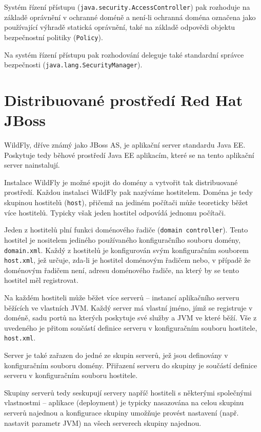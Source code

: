 Systém řízení přístupu ({\tt java.security.AccessController}) pak rozhoduje na základě oprávnění v ochranné doméně a není-li ochranná doména označena jako používající výhradě statická oprávnění, také na základě odpovědi objektu bezpečnostní politiky ({\tt Policy}).

Na systém řízení přístupu pak rozhodování deleguje také standardní správce bezpečnosti ({\tt java.lang.SecurityManager}).


\chapter{Distribuované prostředí Red Hat JBoss}

WildFly, dříve známý jako JBoss AS, je aplikační server standardu Java EE. Poskytuje tedy běhové prostředí Java EE aplikacím, které se na tento aplikační server nainstalují.

Instalace WildFly je možné spojit do domény a vytvořit tak distribuované prostředí. Každou instalaci WildFly pak nazýváme hostitelem. Doména je tedy skupinou hostitelů ({\tt host}), přičemž na jediném počítači může teoreticky běžet více hostitelů. Typicky však jeden hostitel odpovídá jednomu počítači.

Jeden z hostitelů plní funkci doménového řadiče ({\tt domain controller}). Tento hostitel je nositelem jediného používaného konfiguračního souboru domény, {\tt domain.xml}. Každý z hostitelů je konfigurován svým konfiguračním souborem {\tt host.xml}, jež určuje, zda-li je hostitel doménovým řadičem nebo, v případě že doménovým řadičem není, adresu doménového řadiče, na který by se tento hostitel měl registrovat. \cite{jbossDomainSetup}

Na každém hostiteli může běžet více serverů -- instancí aplikačního serveru běžících ve vlastních JVM. Každý server má vlastní jméno, jímž se registruje v doméně, sadu portů na kterých poskytuje své služby a JVM ve které běží. Vše z uvedeného je přitom součástí definice serveru v konfiguračním souboru hostitele, {\tt host.xml}. \cite{jbossDomainSetup}

Server je také zařazen do jedné ze skupin serverů, jež jsou definovány v konfiguračním souboru domény. Přiřazení serveru do skupiny je součástí definice serveru v konfiguračním souboru hostitele. \cite{jbossDomainSetup}

Skupiny serverů tedy seskupují servery napříč hostiteli s některými společnými vlastnostmi -- aplikace (deployment) je typicky nasazována na celou skupinu serverů najednou a konfigurace skupiny umožňuje provést nastavení (např. nastavit parametr JVM) na všech serverech skupiny najednou. \cite{jbossDomainSetup}

